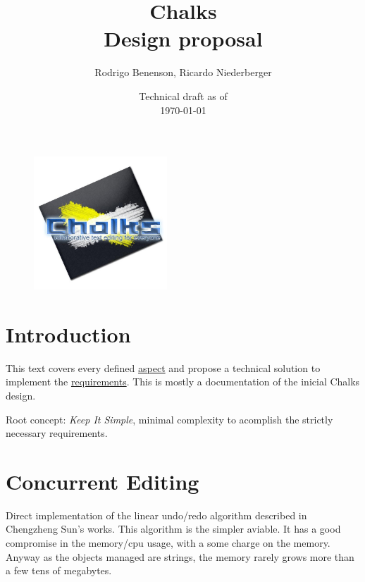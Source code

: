 \documentclass{article}
\title{\large Chalks \\ \huge Design proposal}
\author{Rodrigo Benenson, Ricardo Niederberger}
\date{Technical draft as of\\ \today}
\begin{document}
\begin{figure}[!t]
 \begin{center}
    \includegraphics[angle=0,width=5cm]{schemas/logo.jpg}
 \end{center}
\end{figure}


\maketitle
\thispagestyle{empty}

\newpage
\setcounter{page}{1}


\tableofcontents
\newpage
% 

\section{Introduction}

This text covers every defined \href{http://ryalias.freezope.org/Chalks/Aspects}{aspect} and propose a technical solution to implement the \href{http://ryalias.freezope.org/Chalks/ChalksRequirements}{requirements}.
This is mostly a documentation of the inicial Chalks design.


Root concept: \emph{Keep It Simple}, minimal complexity to acomplish the strictly necessary requirements.


\section{Concurrent Editing}

Direct implementation of the linear undo/redo algorithm described in Chengzheng Sun's works. This algorithm is the simpler aviable. It has a good compromise in the memory/cpu usage, with a some charge on the memory. Anyway as the objects managed are strings, the memory rarely grows more than a few tens of megabytes.
\end{document}
